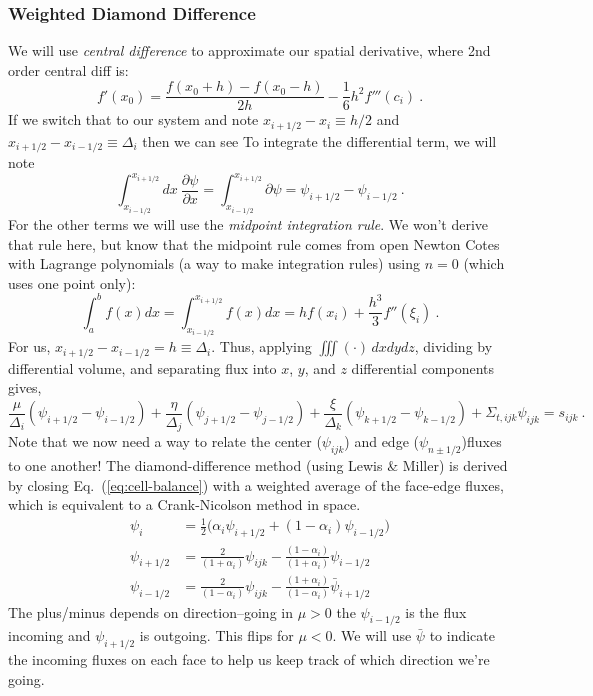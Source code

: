 \documentclass[12pt]{article}
\newcommand{\Di}{\ensuremath{\Delta_i}}
\newcommand{\Dj}{\ensuremath{\Delta_j}}
\newcommand{\Dk}{\ensuremath{\Delta_k}}
\begin{document}
\subsubsection*{Weighted Diamond Difference}
We will use \textit{central difference} to approximate our spatial derivative, where 2nd order central diff is:
\[f'(x_0) = \frac{f(x_0 + h) - f(x_0 - h)}{2h} - \frac{1}{6}h^2 f'''(c_i)\:.\]
If we switch that to our system and note $x_{i+1/2} - x_i \equiv h/2$ and $x_{i+1/2} - x_{i-1/2} \equiv \Di$ then we can see
To integrate the differential term, we will note
\[
\int_{x_{i-1/2}}^{x_{i+1/2}} dx \:\frac{\partial \psi}{\partial x}  = \int_{x_{i-1/2}}^{x_{i+1/2}} \partial \psi = \psi_{i+1/2} - \psi_{i-1/2} \:.
\]
For the other terms we will use the \textit{midpoint integration rule}. We won't derive that rule here, but know that the midpoint rule comes from open Newton Cotes with Lagrange polynomials (a way to make integration rules) using $n=0$ (which uses one point only):
\[\int_a^b f(x)dx = \int_{x_{i-1/2}}^{x_{i+1/2}} f(x)dx = hf(x_i) + \frac{h^3}{3}f''(\xi_i)\:.\]
For us, $x_{i+1/2} - x_{i-1/2} = h \equiv \Di$. Thus, applying $\iiint(\cdot)\,dxdydz$, dividing by differential volume, and separating flux into $x$, $y$, and $z$ differential components gives,
\begin{equation}
  \frac{\mu}{\Delta_i}(\psi_{i+1/2}-\psi_{i-1/2}) +
  \frac{\eta}{\Dj}(\psi_{j+1/2}-\psi_{j-1/2}) +
  \frac{\xi}{\Dk}(\psi_{k+1/2}-\psi_{k-1/2}) + \Sigma_{t,ijk}\psi_{ijk} = s_{ijk}\:.
  \label{eq:cell-balance}
\end{equation}
Note that we now need a way to relate the center ($\psi_{ijk}$) and edge ($\psi_{n\pm 1/2}$)fluxes to one another!
The diamond-difference method (using Lewis \& Miller) is derived by closing
Eq.~(\ref{eq:cell-balance}) with a weighted average of the face-edge fluxes, which is
equivalent to a Crank-Nicolson method in space. 
\begin{align*}
\psi_{i} &= \frac{1}{2}\bigl(\alpha_i\psi_{i+1/2}+(1-\alpha_i)\psi_{i-1/2}\bigr)\\
\psi_{i+1/2} &= \frac{2}{(1+\alpha_i)}\psi_{ijk}-
    \frac{(1-\alpha_i)}{(1+\alpha_i)}\psi_{i-1/2}\\
\psi_{i-1/2} &= \frac{2}{(1-\alpha_i)}\psi_{ijk}-
    \frac{(1+\alpha_i)}{(1-\alpha_i)}\bar{\psi}_{i+1/2}
\end{align*}
The plus/minus depends on direction--going in $\mu>0$ the $\psi_{i-1/2}$ is the flux incoming and $\psi_{i+1/2}$ is outgoing. This flips for $\mu<0$. We will use $\bar{\psi}$ to indicate the incoming fluxes on each face to help us keep track of which direction we're going.
\end{document}
